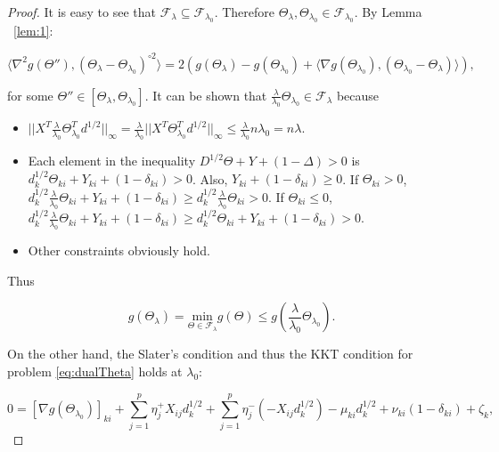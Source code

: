 \documentclass{article}
\begin{document}
\begin{proof}
It is easy to see that $\mathcal{F}_\lambda\subseteq\mathcal{F}_{\lambda_0}$. Therefore $\Theta_\lambda,\Theta_{\lambda_0}\in \mathcal{F}_{\lambda_0}$. By Lemma ~\ref{lem:1}:

\begin{equation}
    \label{eq:thm1.1}
    \langle\nabla^2 g(\Theta''),(\Theta_\lambda-\Theta_{\lambda_0})^{\circ 2}\rangle=2\left(g(\Theta_{\lambda})-g(\Theta_{\lambda_0})+\langle\nabla g(\Theta_{\lambda_0}),(\Theta_{\lambda_0}-\Theta_\lambda)\rangle\right),
\end{equation}

 for some $\Theta''\in[\Theta_\lambda,\Theta_{\lambda_0}]$. It can be shown that $\frac{\lambda}{\lambda_0}\Theta_{\lambda_0}\in\mathcal{F}_\lambda$ because

\begin{itemize}
    \item $||X^T\frac{\lambda}{\lambda_0}\Theta_{\lambda_0}^Td^{1/2}||_\infty=\frac{\lambda}{\lambda_0}||X^T\Theta_{\lambda_0}^Td^{1/2}||_\infty\leq \frac{\lambda}{\lambda_0}n\lambda_0=n\lambda$.
    \item Each element in the inequality $D^{1/2}\Theta+Y+(1-\Delta)> 0$ is $d_k^{1/2}\Theta_{ki}+Y_{ki}+(1-\delta_{ki})>0$. Also, $Y_{ki}+(1-\delta_{ki})\geq 0$. If $\Theta_{ki}>0$, $d_k^{1/2}\frac{\lambda}{\lambda_0}\Theta_{ki}+Y_{ki}+(1-\delta_{ki})\geq d_k^{1/2}\frac{\lambda}{\lambda_0}\Theta_{ki}>0.$ If $\Theta_{ki}\leq0$, $d_k^{1/2}\frac{\lambda}{\lambda_0}\Theta_{ki}+Y_{ki}+(1-\delta_{ki})\geq d_k^{1/2}\Theta_{ki}+Y_{ki}+(1-\delta_{ki})>0.$
    \item Other constraints obviously hold.
\end{itemize}

Thus 

\begin{equation}
    \label{eq:thm1.2}
    g(\Theta_\lambda)=\underset{\Theta\in \mathcal{F}_\lambda}{\mathrm{min}}g(\Theta)\leq g\left(\frac{\lambda}{\lambda_0}\Theta_{\lambda_0}\right).
\end{equation}

On the other hand, the Slater's condition and thus the KKT condition for problem \eqref{eq:dualTheta} holds at $\lambda_0$:

\begin{equation}
    \label{eq:thm1.3}
    0=[\nabla g(\Theta_{\lambda_0})]_{ki}+\sum_{j=1}^p\eta^+_jX_{ij}d_k^{1/2}+\sum_{j=1}^p\eta^-_j(-X_{ij}d_k^{1/2})-\mu_{ki}d_k^{1/2}+\nu_{ki}(1-\delta_{ki})+\zeta_k,
\end{equation}
    

\end{proof}
\end{document}
